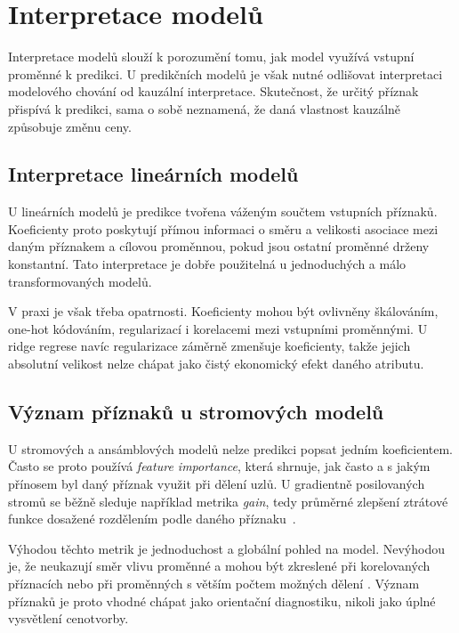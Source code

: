 \section{Interpretace modelů}
\label{sec:model_interpretation}

Interpretace modelů slouží k porozumění tomu, jak model využívá vstupní proměnné k predikci. U predikčních modelů je však nutné odlišovat interpretaci modelového chování od kauzální interpretace. Skutečnost, že určitý příznak přispívá k predikci, sama o sobě neznamená, že daná vlastnost kauzálně způsobuje změnu ceny.

\subsection*{Interpretace lineárních modelů}
\label{subsec:linear_model_interpretation_theory}

U lineárních modelů je predikce tvořena váženým součtem vstupních příznaků.
Koeficienty proto poskytují přímou informaci o směru a velikosti asociace mezi daným příznakem a cílovou proměnnou, pokud jsou ostatní proměnné drženy konstantní. Tato interpretace je dobře použitelná u jednoduchých a málo transformovaných modelů.

V praxi je však třeba opatrnosti. Koeficienty mohou být ovlivněny škálováním, one-hot kódováním, regularizací i korelacemi mezi vstupními proměnnými. U ridge regrese navíc regularizace záměrně zmenšuje koeficienty, takže jejich absolutní velikost nelze chápat jako čistý ekonomický efekt
daného atributu.

\subsection*{Význam příznaků u stromových modelů}
\label{subsec:tree_feature_importance_theory}

U stromových a ansámblových modelů nelze predikci popsat jedním koeficientem. Často se proto používá \textit{feature importance}, která shrnuje, jak často a s jakým přínosem byl daný příznak využit při dělení uzlů. U gradientně posilovaných stromů se běžně sleduje například metrika \textit{gain}, tedy průměrné
zlepšení ztrátové funkce dosažené rozdělením podle daného příznaku~\cite{Breiman2001RandomForests,ChenGuestrin2016XGBoost}.

Výhodou těchto metrik je jednoduchost a globální pohled na model. Nevýhodou je, že neukazují směr vlivu proměnné a mohou být zkreslené při korelovaných příznacích nebo při proměnných s větším počtem možných dělení
\cite{Strobl2008ConditionalImportance}. Význam příznaků je proto vhodné chápat jako orientační diagnostiku, nikoli jako úplné vysvětlení cenotvorby.

